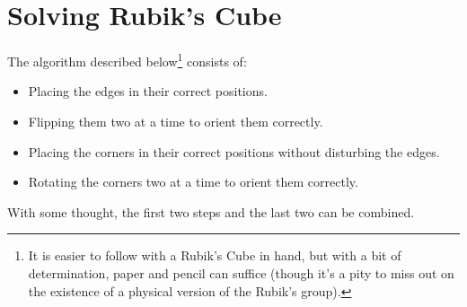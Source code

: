 \section{Solving Rubik's Cube}

The algorithm described below\footnote{It is easier to follow with a Rubik's Cube in hand, but with a bit of determination, paper and pencil can suffice (though it's a pity to miss out on the existence of a physical version of the Rubik's group).} consists of:

\begin{itemize}
    \item Placing the edges in their correct positions.
    \item Flipping them two at a time to orient them correctly.
    \item Placing the corners in their correct positions without disturbing the edges.
    \item Rotating the corners two at a time to orient them correctly.
\end{itemize}
With some thought, the first two steps and the last two can be combined.

